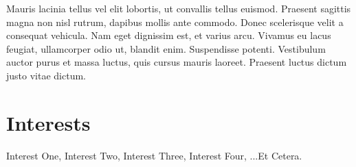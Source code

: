 \documentclass[mm]{simple_style}
\begin{document}
\begin{resume}
\title{}
\begin{position}
Mauris lacinia tellus vel elit lobortis, ut convallis tellus euismod. Praesent 
sagittis magna non nisl rutrum, dapibus mollis ante commodo. Donec scelerisque 
velit a consequat vehicula. Nam eget dignissim est, et varius arcu. Vivamus eu 
lacus feugiat, ullamcorper odio ut, blandit enim. Suspendisse potenti. 
Vestibulum auctor purus et massa luctus, quis cursus mauris laoreet. Praesent 
luctus dictum justo vitae dictum.
\end{position}
\newline
\sectionline
\section{Interests}
Interest One, Interest Two, Interest Three, Interest Four, ...Et Cetera.
\end{resume}
\end{document}
